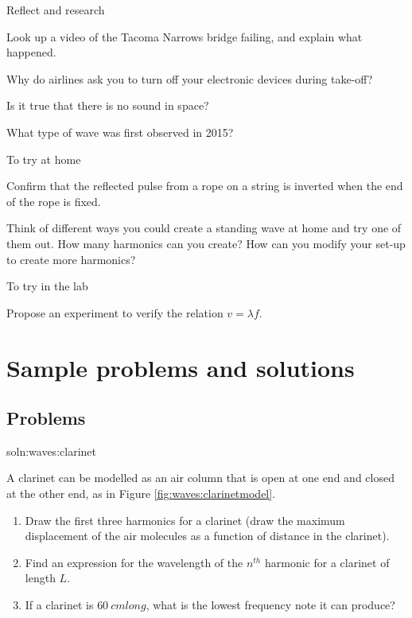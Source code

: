 \begin{chapteractivity}{Reflect and research}
{
\item Look up a video of the Tacoma Narrows bridge failing, and explain what happened.
\item Why do airlines ask you to turn off your electronic devices during take-off?
\item Is it true that there is no sound in space?
\item What type of wave was first observed in 2015?
}
\end{chapteractivity}


\begin{chapteractivity}{To try at home}
{
\item Confirm that the reflected pulse from a rope on a string is inverted when the end of the rope is fixed.
\item Think of different ways you could create a standing wave at home and try one of them out. How many harmonics can you create? How can you modify your set-up to create more harmonics?
}
\end{chapteractivity}

\begin{chapteractivity}{To try in the lab}
{
\item Propose an experiment to verify the relation $v=\lambda f$.
}
\end{chapteractivity}


\newpage
\section{Sample problems and solutions}
\subsection{Problems}

\begin{problem}{soln:waves:clarinet}{\label{prob:waves:clarinet} A clarinet can be modelled as an air column that is open at one end and closed at the other end, as in Figure \ref{fig:waves:clarinetmodel}.
\begin{enumerate}[label=\alph*),topsep=-10pt]
\item Draw the first three harmonics for a clarinet (draw the maximum displacement of the air molecules as a function of distance in the clarinet).
\item Find an expression for the wavelength of the $n^{th}$ harmonic for a clarinet of length $L$.
\item If a clarinet is $\SI{60}{cm} long$, what is the lowest frequency note it can produce?
\end{enumerate}
}
\end{problem}

